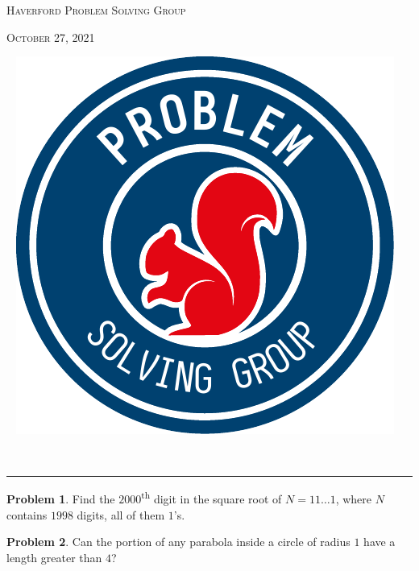 \documentclass{scrartcl}
\theoremstyle{definition}
\newtheorem{prob}{Problem}
\begin{document}
	\begin{minipage}{.6\textwidth}{}
		\textsc{Haverford Problem Solving Group}

		\textsc{October 27, 2021}
	\end{minipage}
	\begin{minipage}{.4\textwidth}{}
		\ \hfill
		\includegraphics[height = .9in]{psg_logo}
	\end{minipage}\\[1em]

	\hrule

	\setcounter{prob}{2}
	\begin{prob}
		Find the $2000$\textsuperscript{th} digit in the square root of $N = 11\dots1$, where $N$ contains $1998$ digits, all of them $1$'s.
	\end{prob}

	\setcounter{prob}{5}
	\begin{prob}
		Can the portion of any parabola inside a circle of radius \(1\) have a length greater than \(4\)?
	\end{prob}

	\setcounter{prob}{9}
\end{document}
